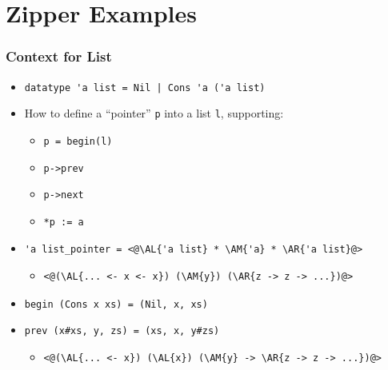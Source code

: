 \section{Zipper Examples}

\begin{frame}
\frametitle{Context for List}

\begin{itemize}
\item \lstinline.datatype 'a list = Nil | Cons 'a ('a list).

\item How to define a ``pointer'' \lstinline|p| into a list \lstinline|l|, supporting:
\begin{itemize}
	\item \lstinline|p = begin(l)|
	\item \lstinline|p->prev|
	\item \lstinline|p->next|
	\item \lstinline|*p := a|
\end{itemize}
\end{itemize}

\framebreak

\begin{itemize}
\newcommand{\AL}[1]{\textcolor{red}{#1}}
\newcommand{\AM}[1]{\textcolor[RGB]{0,170,0}{#1}}
\newcommand{\AR}[1]{\textcolor{blue}{#1}}
\item
\begin{lstlisting}
'a list_pointer = <@\AL{'a list} * \AM{'a} * \AR{'a list}@>
\end{lstlisting}
\begin{itemize}
	\item
\begin{lstlisting}
<@(\AL{... <- x <- x}) (\AM{y}) (\AR{z -> z -> ...})@>
\end{lstlisting}
\end{itemize}

\item \lstinline.begin (Cons x xs) = (Nil, x, xs).

\item \lstinline.prev (x#xs, y, zs) = (xs, x, y#zs).
\begin{itemize}
	\item
\begin{lstlisting}
<@(\AL{... <- x}) (\AL{x}) (\AM{y} -> \AR{z -> z -> ...})@>
\end{lstlisting}
\end{itemize}


\end{itemize}
\end{frame}
